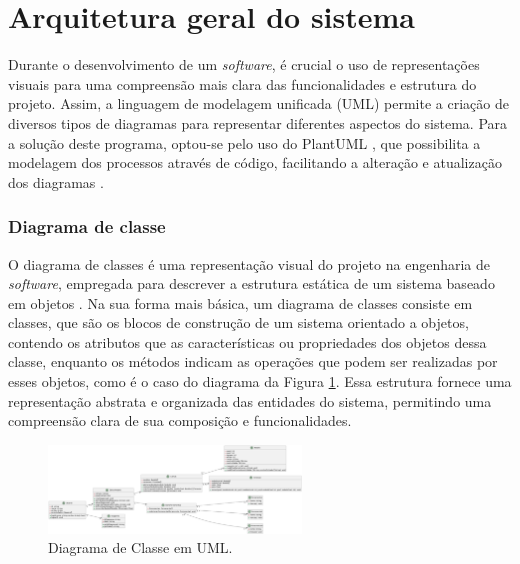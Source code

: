\section{Arquitetura geral do sistema}

Durante o desenvolvimento de um \textit{software}, é crucial o uso de representações visuais para uma compreensão mais clara das funcionalidades e estrutura do projeto. Assim, a linguagem de modelagem unificada (UML) permite a criação de diversos tipos de diagramas para representar diferentes aspectos do sistema. Para a solução deste programa, optou-se pelo uso do PlantUML \cite{plantumldoc}, que possibilita a modelagem dos processos através de código, facilitando a alteração e atualização dos diagramas \cite{softwareengreq}.

\subsubsection{Diagrama de classe}

O diagrama de classes é uma representação visual do projeto na engenharia de \textit{software}, empregada para descrever a estrutura estática de um sistema baseado em objetos \cite{softwareenguml}. Na sua forma mais básica, um diagrama de classes consiste em classes, que são os blocos de construção de um sistema orientado a objetos, contendo os atributos que as características ou propriedades dos objetos dessa classe, enquanto os métodos indicam as operações que podem ser realizadas por esses objetos, como é o caso do diagrama da Figura \ref{fig:ClassDiagram}. Essa estrutura fornece uma representação abstrata e organizada das entidades do sistema, permitindo uma compreensão clara de sua composição e funcionalidades.
            
\begin{figure}[htb]
    \caption{\label{fig:ClassDiagram}Diagrama de Classe em UML.}
    \begin{center}
        \includegraphics[width=0.6\textwidth]{figuras/ClassDiagram.png}
    \end{center}
\end{figure}
            
